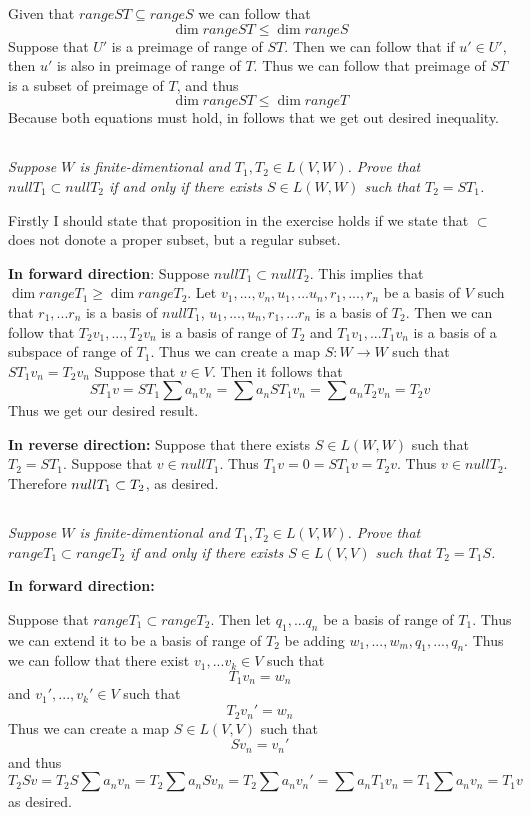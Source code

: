\documentclass[11pt,oneside,titlepage]{book}
\begin{document}
Given that $range ST \subseteq range S$ we can follow that
$$\dim range ST \leq \dim range S$$
Suppose that $U'$ is a preimage of range of $ST$. Then we can follow that if  $u' \in U'$, then
$u'$ is also in preimage of range of $T$. Thus we can follow that preimage of $ST$ is
a subset of preimage of $T$, and thus
$$\dim range ST \leq \dim range T$$
Because both equations must hold, in follows that  we  get out desired inequality.

\subsection{}
\textit{Suppose $W$ is finite-dimentional and $T_1, T_2 \in L(V, W)$. Prove that
  $null T_1 \subset null T_2$ if and only if there exists $S \in L(W, W)$ such that
  $T_2 = ST_1$.}

Firstly I should state that proposition in the exercise holds if we state that
$\subset$ does not donote a proper subset, but a regular subset. 

\textbf{In forward direction}: 
Suppose $null T_1 \subset null T_2$. This implies that $\dim range T_1 \geq \dim range T_2$.
Let $v_1, ..., v_n, u_1, ... u_n, r_1, ..., r_n$ be a basis of $V$ such that
$r_1, ... r_n$ is a basis of $null T_1$,  $u_1, ..., u_n, r_1, ... r_n$ is a basis of $T_2$.
Then we can follow that
$T_2 v_1, ..., T_2 v_n$ is a basis of range of $T_2$ and $T_1 v_1, ... T_1 v_n$ is a
basis of a subspace of range of $T_1$.
Thus we can create a map $S: W \to W$ such that
$S T_1 v_n = T_2 v_n$
Suppose that $v \in V$. Then it follows that
$$S T_1 v = S T_1 \sum a_n v_n =   \sum a_n ST_1 v_n = \sum a_n T_2 v_n = T_2 v$$
Thus we get our desired result.

\textbf{In reverse direction:}
Suppose that there exists $S \in L(W, W)$ such that $T_2 = S T_1$. Suppose that $v \in null T_1$.
Thus $T_1 v = 0 = S T_1 v = T_2 v$. Thus $v \in  null T_2$. Therefore $null T_1 \subset \null T_2$,
as desired.

\subsection{}

\textit{Suppose $W$ is finite-dimentional and $T_1, T_2 \in L(V, W)$. Prove that
  $range T_1 \subset range T_2$ if and only if there exists $S \in L(V, V)$ such that
  $T_2 = T_1S $.}

\textbf{In forward direction:}

Suppose that $range T_1 \subset range T_2$. Then let $q_1, ... q_n$ be a basis of range of $T_1$.
Thus we can extend it to be a basis of range of $T_2$ be adding $w_1, ..., w_m, q_1, ..., q_n$.
Thus we can follow that there exist $v_1, ... v_k \in V$ such that
$$T_1 v_n = w_n$$
and $v_1', ..., v_k' \in V$ such that
$$T_2 v_n' = w_n$$
Thus we can create a map $S \in L(V, V)$ such that
$$S v_n = v_n'$$
and thus
$$T_2 S v = T_2 S \sum a_n v_n = T_2  \sum a_n S v_n = T_2  \sum a_n  v_n'  = \sum a_n T_1 v_n 
=T_1 \sum a_n  v_n = T_1 v$$
as desired.
\end{document}
